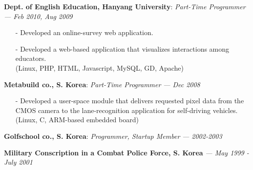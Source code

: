 {\bf Dept. of English Education, Hanyang University}: \emph{Part-Time Programmer}
{\it \footnotesize --- Feb 2010, Aug 2009}
\begin{itemize}[leftmargin=*]
\setlength\itemsep{-0.02in}
 \item[-] Developed an online-survey web application.
 \item[-] Developed a web-based application that visualizes interactions among educators.
          \\
          {\small(Linux, PHP, HTML, Javascript, MySQL, GD, Apache)}
\end{itemize}
\vspace{-0.15in}

{\bf Metabuild co., S. Korea}: \emph{Part-Time Programmer}
{\it \footnotesize --- Dec 2008}
\begin{itemize}[leftmargin=*]
\setlength\itemsep{-0.02in}
 \item[-] Developed a user-space module that delivers requested pixel data from the CMOS camera
          to the lane-recognition application for self-driving vehicles.\\
          {\small(Linux, C, ARM-based embedded board)}
\end{itemize}
\vspace{-0.15in}

{\bf Golfschool co., S. Korea}: \emph{Programmer, Startup Member}
{\it \footnotesize --- 2002-2003}
\vspace{-0.15in}

{\bf Military Conscription in a Combat Police Force, S. Korea}
{\it \footnotesize --- May 1999 - July 2001}

